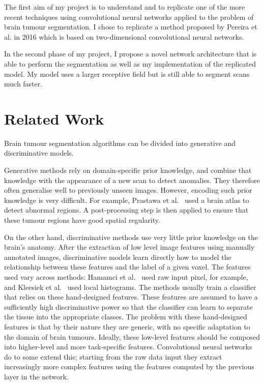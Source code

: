 \documentclass[12pt,a4paper,twoside,openright]{report}
\begin{document}
The first aim of my project is to understand and to replicate one of the more recent techniques using convolutional neural networks applied to the problem of brain tumour segmentation. I chose to replicate a method proposed by Pereira et al.\cite{pereira} in 2016 which is based on two-dimensional convolutional neural networks. 

In the second phase of my project, I propose a novel network architecture that is able to perform the segmentation as well as my implementation of the replicated model. My model uses a larger receptive field but is still able to segment scans much faster.

\section{Related Work}
Brain tumour segmentation algorithms can be divided into generative and discriminative models.

Generative methods rely on domain-specific prior knowledge, and combine that knowledge with the appearance of a new scan to detect anomalies. They therefore often generalise well to previously unseen images. However, encoding such prior knowledge is very difficult. For example, Prastawa et al.\ \cite{prastawa} used a brain atlas to detect abnormal regions. A post-processing step is then applied to ensure that these tumour regions have good spatial regularity.

On the other hand, discriminative methods use very little prior knowledge on the brain's anatomy. After the extraction of low level image features using manually annotated images, discriminative models learn directly how to model the relationship between these features and the label of a given voxel. The features used vary across methods: Hamamci et al.\ \cite{hamamci} used raw input pixel, for example, and Kleesiek et al.\ \cite{kleesiek} used local histograms. The methods usually train a classifier that relies on these hand-designed features. These features are assumed to have a sufficiently high discriminative power so that the classifier can learn to separate the tissue into the appropriate classes. The problem with these hand-designed features is that by their nature they are generic, with no specific adaptation to the domain of brain tumours. Ideally, these low-level features should be composed into higher-level and more task-specific features. Convolutional neural networks do to some extend this; starting from the raw data input they extract increasingly more complex features using the features computed by the previous layer in the network.
\end{document}
